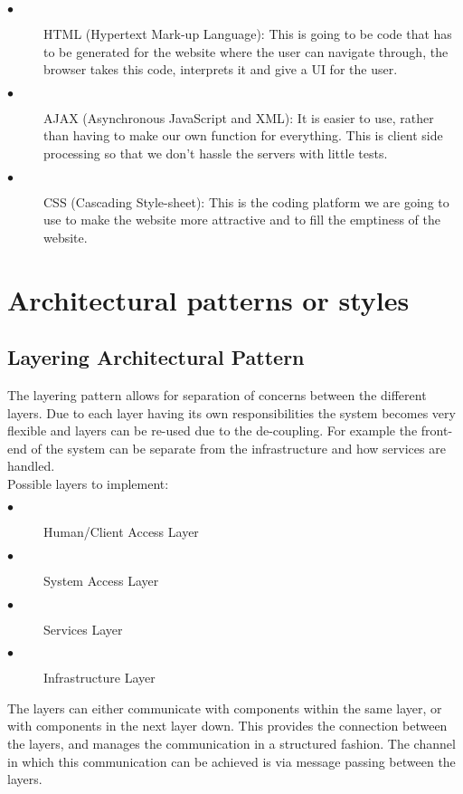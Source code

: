 \documentclass[hidelinks, 12pt]{article}
\begin{document}
\begin{description}
  \item[$\bullet$] HTML (Hypertext Mark-up Language):
  This is going to be code that has to be generated for the website where the user can navigate through, the browser takes this code, interprets it and give a UI for the user. 
  
  \item[$\bullet$] AJAX (Asynchronous JavaScript and XML):
  It is easier to use, rather than having to make our own function for everything. This is client side processing so that we don’t hassle the servers with little tests.
  
  \item[$\bullet$] CSS (Cascading Style-sheet):
  This is the coding platform we are going to use to make the website more attractive and to fill the emptiness of the website.
\end{description}

\section{Architectural patterns or styles}
\subsection{Layering Architectural Pattern}
The layering pattern allows for separation of concerns between the different layers. Due to each layer having its own responsibilities the system becomes very flexible and layers can be re-used due to the de-coupling. For example the front-end of the system can be separate from the infrastructure and how services are handled.\\
Possible layers to implement: 
\begin{description}
\item[$\bullet$]Human/Client Access Layer
\item[$\bullet$]System Access Layer
\item[$\bullet$]Services Layer
\item[$\bullet$]Infrastructure Layer
\end{description}
The layers can either communicate with components within the same layer, or with components in the next layer down. This provides the connection between the layers, and manages the communication
in a structured fashion. The channel in which this communication can be achieved is via message passing between the layers.
\end{document}
